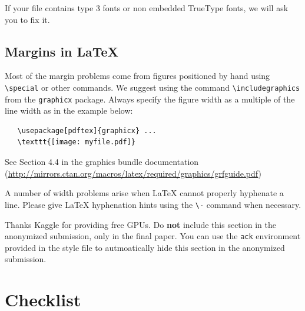\documentclass{article}
\begin{document}
If your file contains type 3 fonts or non embedded TrueType fonts, we will ask
you to fix it.


\subsection{Margins in \LaTeX{}}


Most of the margin problems come from figures positioned by hand using
\verb+\special+ or other commands. We suggest using the command
\verb+\includegraphics+ from the \verb+graphicx+ package. Always specify the
figure width as a multiple of the line width as in the example below:
\begin{verbatim}
   \usepackage[pdftex]{graphicx} ...
   \texttt{[image: myfile.pdf]}
\end{verbatim}
See Section 4.4 in the graphics bundle documentation
(\url{http://mirrors.ctan.org/macros/latex/required/graphics/grfguide.pdf})


A number of width problems arise when \LaTeX{} cannot properly hyphenate a
line. Please give LaTeX hyphenation hints using the \verb+\-+ command when
necessary.

\begin{ack}
Thanks Kaggle for providing free GPUs.
Do {\bf not} include this section in the anonymized submission, only in the final paper. You can use the \texttt{ack} environment provided in the style file to autmoatically hide this section in the anonymized submission.
\end{ack}







\section*{Checklist}
\end{document}
